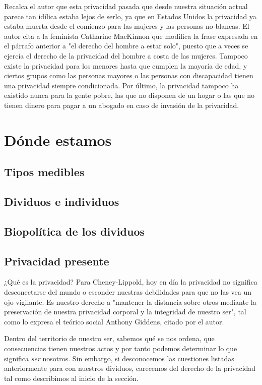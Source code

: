 \documentclass[11pt]{article}
\begin{document}
Recalca el autor que esta privacidad pasada que desde nuestra situación actual parece tan idílica estaba lejos de serlo, ya que en Estados Unidos la privacidad ya estaba muerta desde el comienzo para las mujeres y las personas no blancas. El autor cita a la feminista Catharine MacKinnon que modifica la frase expresada en el párrafo anterior a "el derecho del hombre a estar solo", puesto que a veces se ejercía el derecho de la privacidad del hombre a costa de las mujeres. Tampoco existe la privacidad para los menores hasta que cumplen la mayoría de edad, y ciertos grupos como las personas mayores o las personas con discapacidad tienen una privacidad siempre condicionada. Por último, la privacidad tampoco ha existido nunca para la gente pobre, las que no disponen de un hogar o las que no tienen dinero para pagar a un abogado en caso de invasión de la privacidad.
\section{Dónde estamos}
\subsection{Tipos medibles}
\subsection{Dividuos e individuos}
\subsection{Biopolítica de los dividuos}
\subsection{Privacidad presente}
¿Qué es la privacidad? Para Cheney-Lippold, hoy en día la privacidad no significa desconectarse del mundo o esconder nuestras debilidades para que no las vea un ojo vigilante. Es nuestro derecho a "mantener la distancia sobre otros mediante la preservación de nuestra privacidad corporal y la integridad de nuestro ser", tal como lo expresa el teórico social Anthony Giddens, citado por el autor. 

Dentro del territorio de nuestro ser, sabemos qué se nos ordena, que consecuencias tienen nuestros actos y por tanto podemos determinar lo que significa \textit{ser} nosotros. Sin embargo, si desconocemos las cuestiones listadas anteriormente para con nuestros dividuos, carecemos del derecho de la privacidad tal como describimos al inicio de la sección.
\end{document}
